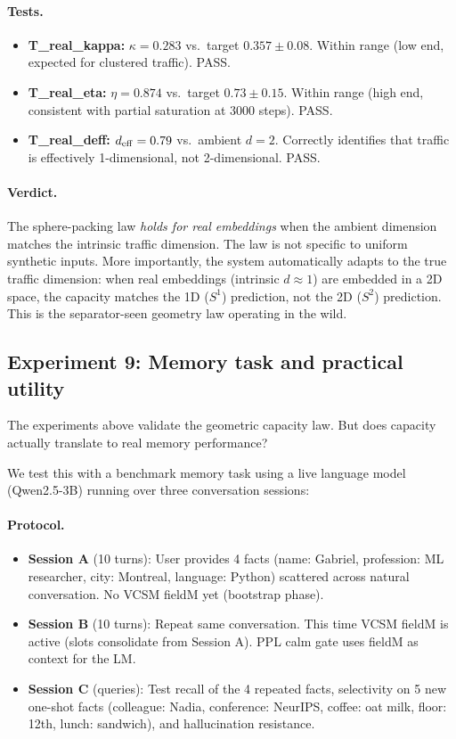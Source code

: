 \documentclass[11pt]{article}
\begin{document}
\paragraph{Tests.}
\begin{itemize}
  \item \textbf{T\_real\_kappa:} $\kappa = 0.283$ vs.\ target $0.357 \pm 0.08$.
    Within range (low end, expected for clustered traffic).
    PASS.
  \item \textbf{T\_real\_eta:} $\eta = 0.874$ vs.\ target $0.73 \pm 0.15$.
    Within range (high end, consistent with partial saturation at 3000 steps).
    PASS.
  \item \textbf{T\_real\_deff:} $d_{\rm eff} = 0.79$ vs.\ ambient $d=2$.
    Correctly identifies that traffic is effectively 1-dimensional, not 2-dimensional.
    PASS.
\end{itemize}

\paragraph{Verdict.}
The sphere-packing law \emph{holds for real embeddings} when the ambient dimension
matches the intrinsic traffic dimension.
The law is not specific to uniform synthetic inputs.
More importantly, the system automatically adapts to the true traffic dimension:
when real embeddings (intrinsic $d \approx 1$) are embedded in a 2D space,
the capacity matches the 1D ($S^1$) prediction, not the 2D ($S^2$) prediction.
This is the separator-seen geometry law operating in the wild.

\subsection{Experiment 9: Memory task and practical utility}
\label{sec:memory_task}

The experiments above validate the geometric capacity law.
But does capacity actually translate to real memory performance?

We test this with a benchmark memory task using a live language model
(Qwen2.5-3B) running over three conversation sessions:

\paragraph{Protocol.}
\begin{itemize}
  \item \textbf{Session A} (10 turns): User provides 4 facts (name: Gabriel, profession: ML researcher,
    city: Montreal, language: Python) scattered across natural conversation.
    No VCSM fieldM yet (bootstrap phase).
  \item \textbf{Session B} (10 turns): Repeat same conversation.
    This time VCSM fieldM is active (slots consolidate from Session A).
    PPL calm gate uses fieldM as context for the LM.
  \item \textbf{Session C} (queries): Test recall of the 4 repeated facts, selectivity on
    5 new one-shot facts (colleague: Nadia, conference: NeurIPS, coffee: oat milk,
    floor: 12th, lunch: sandwich), and hallucination resistance.
\end{itemize}
\end{document}
